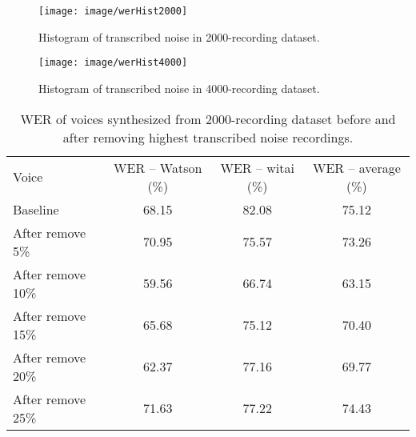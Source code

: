 \documentclass[12pt]{article}
\begin{document}
\begin{figure}[t]
\begin{center}
\texttt{[image: image/werHist2000]}
\end{center}
\vspace{-0.3cm}
\caption[Histogram of transcribed noise in 2000-recording dataset.]{Histogram of transcribed noise in 2000-recording dataset.}
\label{fig_transcribedNoiseHist2000}
\end{figure}

\begin{figure}[t]
\begin{center}
\texttt{[image: image/werHist4000]}
\end{center}
\vspace{-0.3cm}
\caption[Histogram of transcribed noise in 4000-recording dataset.]{Histogram of transcribed noise in 4000-recording dataset.}
\label{fig_transcribedNoiseHist4000}
\end{figure}

\begin{table}[]
\begin{center}
\caption{WER of voices synthesized from 2000-recording dataset before and after removing highest transcribed noise recordings.}
\label{tab_werTranscribedNoise2000}
\vspace{3mm}
\begin{tabular}{lccc}
\hline
Voice & WER – Watson (\%) & WER – witai (\%) & WER – average (\%)\\
\cmidrule(l{0pt}r{2pt}){1-1}\cmidrule(l{0pt}r{2pt}){2-2}\cmidrule(l{0pt}r{2pt}){3-3}\cmidrule(l{0pt}r{2pt}){4-4}
Baseline          & 68.15 & 82.08 & 75.12 \\
After remove 5\%  & 70.95 & 75.57 & 73.26 \\
After remove 10\% & 59.56 & 66.74 & 63.15 \\
After remove 15\% & 65.68 & 75.12 & 70.40 \\
After remove 20\% & 62.37 & 77.16 & 69.77 \\
After remove 25\% & 71.63 & 77.22 & 74.43 \\
\hline
\end{tabular}
\end{center}
\end{table}
\end{document}
